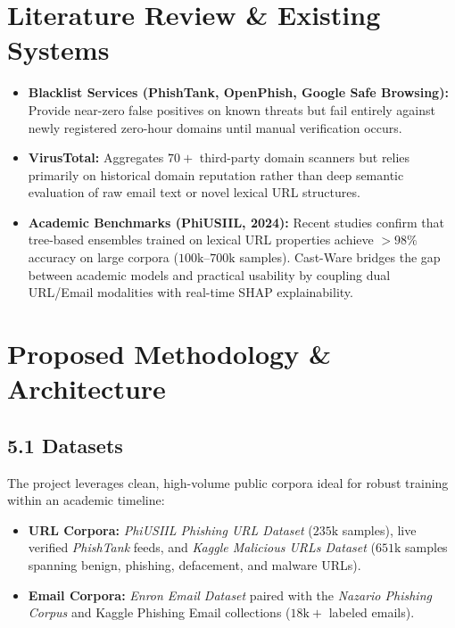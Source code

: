 \documentclass[10pt, a4paper]{article}
\begin{document}
\section{Literature Review \& Existing Systems}
\begin{itemize}
    \item \textbf{Blacklist Services (PhishTank, OpenPhish, Google Safe Browsing):} Provide near-zero false positives on known threats but fail entirely against newly registered zero-hour domains until manual verification occurs.
    \item \textbf{VirusTotal:} Aggregates $70+$ third-party domain scanners but relies primarily on historical domain reputation rather than deep semantic evaluation of raw email text or novel lexical URL structures.
    \item \textbf{Academic Benchmarks (PhiUSIIL, 2024):} Recent studies confirm that tree-based ensembles trained on lexical URL properties achieve $>98\%$ accuracy on large corpora ($100\text{k}$--$700\text{k}$ samples). Cast-Ware bridges the gap between academic models and practical usability by coupling dual URL/Email modalities with real-time SHAP explainability.
\end{itemize}

\section{Proposed Methodology \& Architecture}
\subsection{5.1 Datasets}
The project leverages clean, high-volume public corpora ideal for robust training within an academic timeline:
\begin{itemize}
    \item \textbf{URL Corpora:} \textit{PhiUSIIL Phishing URL Dataset} ($235\text{k}$ samples), live verified \textit{PhishTank} feeds, and \textit{Kaggle Malicious URLs Dataset} ($651\text{k}$ samples spanning benign, phishing, defacement, and malware URLs).
    \item \textbf{Email Corpora:} \textit{Enron Email Dataset} paired with the \textit{Nazario Phishing Corpus} and Kaggle Phishing Email collections ($18\text{k}+$ labeled emails).
\end{itemize}
\end{document}
